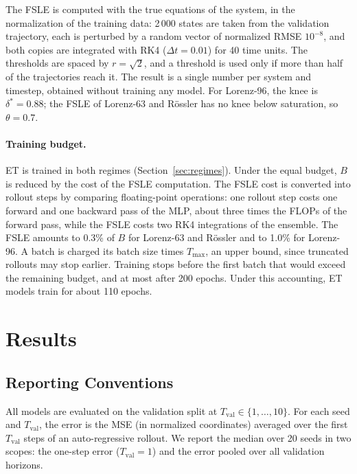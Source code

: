 \documentclass{article}
\begin{document}
The FSLE is computed with the true equations of the system, in the normalization of the training data: 2\,000 states are taken from the validation trajectory, each is perturbed by a random vector of normalized RMSE $10^{-8}$, and both copies are integrated with RK4 ($\Delta t = 0.01$) for 40 time units. The thresholds are spaced by $r = \sqrt{2}$, and a threshold is used only if more than half of the trajectories reach it. The result is a single number per system and timestep, obtained without training any model. For Lorenz-96, the knee is $\delta^* = 0.88$; the FSLE of Lorenz-63 and Rössler has no knee below saturation, so $\theta = 0.7$.

\paragraph{Training budget.}
ET is trained in both regimes (Section~\ref{sec:regimes}). Under the equal budget, $B$ is reduced by the cost of the FSLE computation. The FSLE cost is converted into rollout steps by comparing floating-point operations: one rollout step costs one forward and one backward pass of the MLP, about three times the FLOPs of the forward pass, while the FSLE costs two RK4 integrations of the ensemble. The FSLE amounts to 0.3\% of $B$ for Lorenz-63 and Rössler and to 1.0\% for Lorenz-96. A batch is charged its batch size times $T_{\max}$, an upper bound, since truncated rollouts may stop earlier. Training stops before the first batch that would exceed the remaining budget, and at most after 200 epochs. Under this accounting, ET models train for about 110 epochs.

\newpage

\section{Results}

\subsection{Reporting Conventions}
\label{sec:reporting}

All models are evaluated on the validation split at $T_{\mathrm{val}} \in \{1, \dots, 10\}$. For each seed and $T_{\mathrm{val}}$, the error is the MSE (in normalized coordinates) averaged over the first $T_{\mathrm{val}}$ steps of an auto-regressive rollout. We report the median over 20 seeds in two scopes: the one-step error ($T_{\mathrm{val}} = 1$) and the error pooled over all validation horizons.
\end{document}
